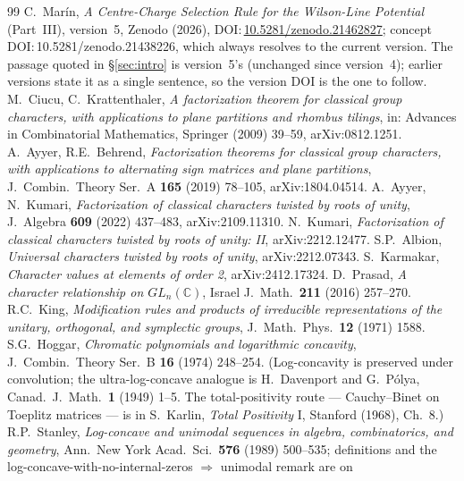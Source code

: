 \documentclass[11pt,a4paper]{article}
\begin{document}
\begin{thebibliography}{99}
 C.~Mar\'in, \emph{A Centre-Charge Selection Rule for the Wilson-Line
Potential} (Part~III), version~5, Zenodo (2026),
DOI:\,\href{https://doi.org/10.5281/zenodo.21462827}{10.5281/zenodo.21462827}; concept
DOI:\,10.5281/zenodo.21438226, which always resolves to the current version. The passage
quoted in \S\ref{sec:intro} is version~5's (unchanged since version~4); earlier versions state it as a single sentence,
so the version DOI is the one to follow.
 M.~Ciucu, C.~Krattenthaler, \emph{A factorization theorem for classical group
characters, with applications to plane partitions and rhombus tilings}, in: Advances in
Combinatorial Mathematics, Springer (2009) 39--59, arXiv:0812.1251.
 A.~Ayyer, R.E.~Behrend, \emph{Factorization theorems for classical group
characters, with applications to alternating sign matrices and plane partitions},
J.~Combin.\ Theory Ser.~A \textbf{165} (2019) 78--105, arXiv:1804.04514.
 A.~Ayyer, N.~Kumari, \emph{Factorization of classical characters twisted by roots
of unity}, J.~Algebra \textbf{609} (2022) 437--483, arXiv:2109.11310.
 N.~Kumari, \emph{Factorization of classical characters twisted by roots of
unity: II}, arXiv:2212.12477.
 S.P.~Albion, \emph{Universal characters twisted by roots of unity},
arXiv:2212.07343.
 S.~Karmakar, \emph{Character values at elements of order 2},
arXiv:2412.17324.
 D.~Prasad, \emph{A character relationship on $GL_n(\mathbb C)$},
Israel J.\ Math.\ \textbf{211} (2016) 257--270.
 R.C.~King, \emph{Modification rules and products of irreducible
representations of the unitary, orthogonal, and symplectic groups}, J.~Math.\ Phys.\
\textbf{12} (1971) 1588.
 S.G.~Hoggar, \emph{Chromatic polynomials and logarithmic concavity},
J.~Combin.\ Theory Ser.~B \textbf{16} (1974) 248--254. (Log-concavity is preserved under
convolution; the ultra-log-concave analogue is H.~Davenport and G.~P\'olya,
Canad.\ J.~Math.\ \textbf{1} (1949) 1--5. The total-positivity route --- Cauchy--Binet on
Toeplitz matrices --- is in S.~Karlin, \emph{Total Positivity} I, Stanford (1968), Ch.~8.)
\bibitem{Stanley} R.P.~Stanley, \emph{Log-concave and unimodal sequences in algebra,
combinatorics, and geometry}, Ann.\ New York Acad.\ Sci.\ \textbf{576} (1989) 500--535;
definitions and the log-concave-with-no-internal-zeros $\Rightarrow$ unimodal remark are on

\end{thebibliography}
\end{document}
